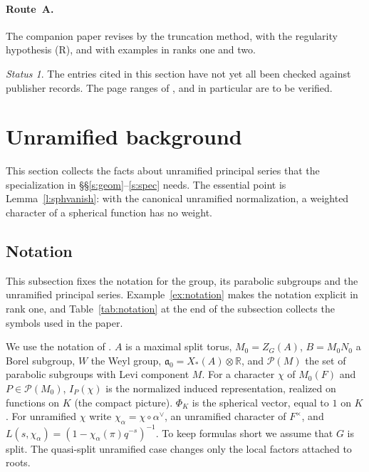 \documentclass[12pt,letterpaper]{article}
\numberwithin{equation}{section}
\theoremstyle{plain}
\theoremstyle{definition}
\theoremstyle{remark}
\newtheorem{status}[theorem]{Status}
\newcommand{\cP}{\mathcal{P}}
\newcommand{\fa}{\mathfrak{a}}
\begin{document}
\paragraph{Route~A.} The companion paper \cite{JC26} revises \cite{Jo92} by the truncation method, with the regularity hypothesis (R), and with examples in ranks one and two.

\begin{status}
The entries cited in this section have not yet all been checked against publisher records. The page ranges of \cite{Ar01,Ar02,Ar03}, \cite{MW16} and \cite{Wa10} in particular are to be verified.
\end{status}

\section{Unramified background}\label{s:bg}

This section collects the facts about unramified principal series that the specialization in \S\S\ref{s:geom}--\ref{s:spec} needs. The essential point is Lemma~\ref{l:sphvanish}: with the canonical unramified normalization, a weighted character of a spherical function has no weight.

\subsection{Notation}\label{s:notation}

This subsection fixes the notation for the group, its parabolic subgroups and the unramified principal series. Example~\ref{ex:notation} makes the notation explicit in rank one, and Table~\ref{tab:notation} at the end of the subsection collects the symbols used in the paper.

We use the notation of \cite[\S2]{JC26}. $A$ is a maximal split torus, $M_0=Z_G(A)$, $B=M_0N_0$ a Borel subgroup, $W$ the Weyl group, $\fa_0=X_*(A)\otimes\mathbb{R}$, and $\cP(M)$ the set of parabolic subgroups with Levi component $M$. For a character $\chi$ of $M_0(F)$ and $P\in\cP(M_0)$, $I_P(\chi)$ is the normalized induced representation, realized on functions on $K$ (the compact picture). $\Phi_K$ is the spherical vector, equal to $1$ on $K$. For unramified $\chi$ write $\chi_\alpha=\chi\circ\alpha^\vee$, an unramified character of $F^\times$, and $L(s,\chi_\alpha)=(1-\chi_\alpha(\pi)q^{-s})^{-1}$. To keep formulas short we assume that $G$ is split. The quasi-split unramified case changes only the local factors attached to roots.
\end{document}
